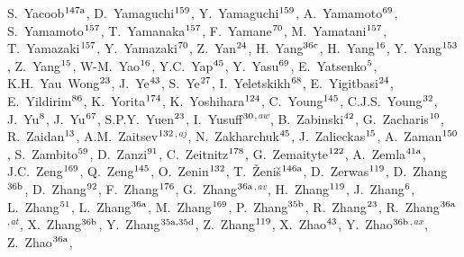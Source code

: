 \begin{flushleft}
S.~Yacoob$^\textrm{\scriptsize 147a}$,
D.~Yamaguchi$^\textrm{\scriptsize 159}$,
Y.~Yamaguchi$^\textrm{\scriptsize 159}$,
A.~Yamamoto$^\textrm{\scriptsize 69}$,
S.~Yamamoto$^\textrm{\scriptsize 157}$,
T.~Yamanaka$^\textrm{\scriptsize 157}$,
F.~Yamane$^\textrm{\scriptsize 70}$,
M.~Yamatani$^\textrm{\scriptsize 157}$,
T.~Yamazaki$^\textrm{\scriptsize 157}$,
Y.~Yamazaki$^\textrm{\scriptsize 70}$,
Z.~Yan$^\textrm{\scriptsize 24}$,
H.~Yang$^\textrm{\scriptsize 36c}$,
H.~Yang$^\textrm{\scriptsize 16}$,
Y.~Yang$^\textrm{\scriptsize 153}$,
Z.~Yang$^\textrm{\scriptsize 15}$,
W-M.~Yao$^\textrm{\scriptsize 16}$,
Y.C.~Yap$^\textrm{\scriptsize 45}$,
Y.~Yasu$^\textrm{\scriptsize 69}$,
E.~Yatsenko$^\textrm{\scriptsize 5}$,
K.H.~Yau~Wong$^\textrm{\scriptsize 23}$,
J.~Ye$^\textrm{\scriptsize 43}$,
S.~Ye$^\textrm{\scriptsize 27}$,
I.~Yeletskikh$^\textrm{\scriptsize 68}$,
E.~Yigitbasi$^\textrm{\scriptsize 24}$,
E.~Yildirim$^\textrm{\scriptsize 86}$,
K.~Yorita$^\textrm{\scriptsize 174}$,
K.~Yoshihara$^\textrm{\scriptsize 124}$,
C.~Young$^\textrm{\scriptsize 145}$,
C.J.S.~Young$^\textrm{\scriptsize 32}$,
J.~Yu$^\textrm{\scriptsize 8}$,
J.~Yu$^\textrm{\scriptsize 67}$,
S.P.Y.~Yuen$^\textrm{\scriptsize 23}$,
I.~Yusuff$^\textrm{\scriptsize 30}$$^{,aw}$,
B.~Zabinski$^\textrm{\scriptsize 42}$,
G.~Zacharis$^\textrm{\scriptsize 10}$,
R.~Zaidan$^\textrm{\scriptsize 13}$,
A.M.~Zaitsev$^\textrm{\scriptsize 132}$$^{,aj}$,
N.~Zakharchuk$^\textrm{\scriptsize 45}$,
J.~Zalieckas$^\textrm{\scriptsize 15}$,
A.~Zaman$^\textrm{\scriptsize 150}$,
S.~Zambito$^\textrm{\scriptsize 59}$,
D.~Zanzi$^\textrm{\scriptsize 91}$,
C.~Zeitnitz$^\textrm{\scriptsize 178}$,
G.~Zemaityte$^\textrm{\scriptsize 122}$,
A.~Zemla$^\textrm{\scriptsize 41a}$,
J.C.~Zeng$^\textrm{\scriptsize 169}$,
Q.~Zeng$^\textrm{\scriptsize 145}$,
O.~Zenin$^\textrm{\scriptsize 132}$,
T.~\v{Z}eni\v{s}$^\textrm{\scriptsize 146a}$,
D.~Zerwas$^\textrm{\scriptsize 119}$,
D.~Zhang$^\textrm{\scriptsize 36b}$,
D.~Zhang$^\textrm{\scriptsize 92}$,
F.~Zhang$^\textrm{\scriptsize 176}$,
G.~Zhang$^\textrm{\scriptsize 36a}$$^{,av}$,
H.~Zhang$^\textrm{\scriptsize 119}$,
J.~Zhang$^\textrm{\scriptsize 6}$,
L.~Zhang$^\textrm{\scriptsize 51}$,
L.~Zhang$^\textrm{\scriptsize 36a}$,
M.~Zhang$^\textrm{\scriptsize 169}$,
P.~Zhang$^\textrm{\scriptsize 35b}$,
R.~Zhang$^\textrm{\scriptsize 23}$,
R.~Zhang$^\textrm{\scriptsize 36a}$$^{,at}$,
X.~Zhang$^\textrm{\scriptsize 36b}$,
Y.~Zhang$^\textrm{\scriptsize 35a,35d}$,
Z.~Zhang$^\textrm{\scriptsize 119}$,
X.~Zhao$^\textrm{\scriptsize 43}$,
Y.~Zhao$^\textrm{\scriptsize 36b}$$^{,ax}$,
Z.~Zhao$^\textrm{\scriptsize 36a}$,
$$
\end{flushleft}
